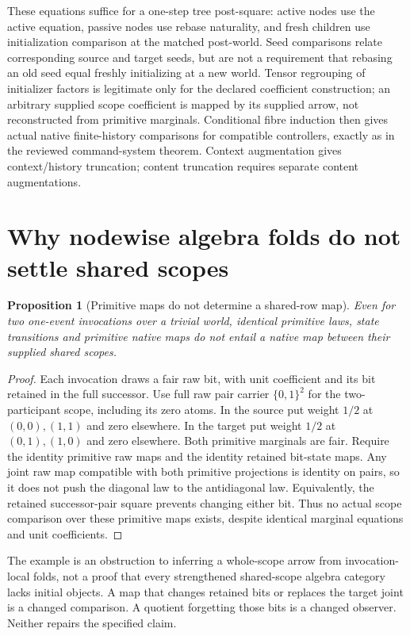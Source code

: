 \documentclass[11pt]{article}
\newtheorem{proposition}{Proposition}\newtheorem{definition}[proposition]{Definition}
\begin{document}
These equations suffice for a one-step tree post-square: active nodes use the active equation, passive nodes use rebase naturality, and fresh children use initialization comparison at the matched post-world. Seed comparisons relate corresponding source and target seeds, but are not a requirement that rebasing an old seed equal freshly initializing at a new world. Tensor regrouping of initializer factors is legitimate only for the declared coefficient construction; an arbitrary supplied scope coefficient is mapped by its supplied arrow, not reconstructed from primitive marginals. Conditional fibre induction then gives actual native finite-history comparisons for compatible controllers, exactly as in the reviewed command-system theorem. Context augmentation gives context/history truncation; content truncation requires separate content augmentations.

\section{Why nodewise algebra folds do not settle shared scopes}
\begin{proposition}[Primitive maps do not determine a shared-row map]
Even for two one-event invocations over a trivial world, identical primitive laws, state transitions and primitive native maps do not entail a native map between their supplied shared scopes.
\end{proposition}
\begin{proof}
Each invocation draws a fair raw bit, with unit coefficient and its bit retained in the full successor. Use full raw pair carrier $\{0,1\}^2$ for the two-participant scope, including its zero atoms. In the source put weight $1/2$ at $(0,0),(1,1)$ and zero elsewhere. In the target put weight $1/2$ at $(0,1),(1,0)$ and zero elsewhere. Both primitive marginals are fair. Require the identity primitive raw maps and the identity retained bit-state maps. Any joint raw map compatible with both primitive projections is identity on pairs, so it does not push the diagonal law to the antidiagonal law. Equivalently, the retained successor-pair square prevents changing either bit. Thus no actual scope comparison over these primitive maps exists, despite identical marginal equations and unit coefficients.
\end{proof}

The example is an obstruction to inferring a whole-scope arrow from invocation-local folds, not a proof that every strengthened shared-scope algebra category lacks initial objects. A map that changes retained bits or replaces the target joint is a changed comparison. A quotient forgetting those bits is a changed observer. Neither repairs the specified claim.
\end{document}
